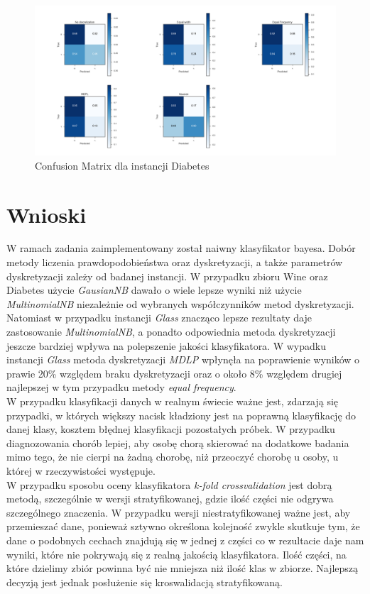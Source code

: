 \documentclass[12pt,a4paper]{article}
\begin{document}
\begin{figure}[H]
\centering
\includegraphics[width=1\textwidth]{diabetesCM.png}
\caption{Confusion Matrix dla instancji Diabetes}
\end{figure}





\section{Wnioski}
W ramach zadania zaimplementowany został naiwny klasyfikator bayesa. Dobór metody liczenia prawdopodobieństwa oraz dyskretyzacji, a także parametrów dyskretyzacji zależy od badanej instancji. W przypadku zbioru Wine oraz Diabetes użycie \emph{GausianNB} dawało o wiele lepsze wyniki niż użycie \emph{MultinomialNB} niezależnie od wybranych współczynników metod dyskretyzacji.\\
Natomiast w przypadku instancji \emph{Glass} znacząco lepsze rezultaty daje zastosowanie \emph{MultinomialNB}, a ponadto odpowiednia metoda dyskretyzacji jeszcze bardziej wpływa na polepszenie jakości klasyfikatora. W wypadku instancji \emph{Glass} metoda dyskretyzacji \emph{MDLP} wpłynęła na poprawienie wyników o prawie 20\% względem  braku dyskretyzacji oraz o około 8\% względem drugiej najlepszej w tym przypadku metody \emph{equal frequency}.\\
W przypadku klasyfikacji danych w realnym świecie ważne jest, zdarzają się przypadki, w których większy nacisk kładziony jest na poprawną klasyfikację do danej klasy, kosztem błędnej klasyfikacji pozostałych próbek. W przypadku diagnozowania chorób lepiej, aby osobę chorą skierować na dodatkowe badania mimo tego, że nie cierpi na żadną chorobę, niż przeoczyć chorobę u osoby, u której w rzeczywistości występuje.\\
W przypadku sposobu oceny klasyfikatora \emph{k-fold crossvalidation} jest dobrą metodą, szczególnie w wersji stratyfikowanej, gdzie ilość części nie odgrywa szczególnego znaczenia. W przypadku wersji niestratyfikowanej ważne jest, aby przemieszać dane, ponieważ sztywno określona kolejność zwykle skutkuje tym, że dane o podobnych cechach znajdują się w jednej z części co w rezultacie daje nam wyniki, które nie pokrywają się z realną jakością klasyfikatora. Ilość części, na które dzielimy zbiór powinna być nie mniejsza niż ilość klas w zbiorze. Najlepszą decyzją jest jednak posłużenie się kroswalidacją stratyfikowaną.
\end{document}
